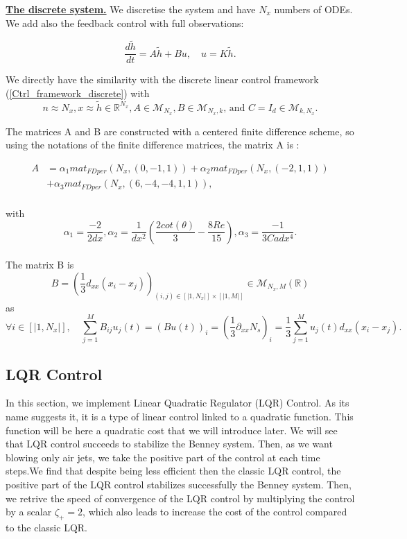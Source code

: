\documentclass[12pt]{article}
\begin{document}
\underline{\textbf{The discrete system.}}
We discretise the system and have $N_x$ numbers of ODEs. We add also the feedback control with full observations: 

\begin{equation}\label{eq_discrete_ctrl_FLF}
\boxed{
\frac{d\tilde{h}}{dt} = A\tilde{h} + B u, \quad u = K\tilde{h}.}
 \end{equation}

We directly have the similarity with the discrete linear control framework (\ref{Ctrl_framework_discrete}) with $$n \approx N_x, x \approx \tilde{h} \in \mathbb{R}^{N_x}, A \in \mathcal{M}_{N_x}, B\in \mathcal{M}_{N_x, k} \text{, and }  C= I_d \in \mathcal{M}_{k, N_x}.$$

The matrices A and B are constructed with a centered finite difference scheme, so using the notations of the finite difference matrices, the matrix A is : 

\begin{equation}
\boxed{
\begin{aligned}
    A &= \alpha_1 mat_{FDper}(N_x, (0, -1, 1))+\alpha_2 mat_{FDper}(N_x, (-2, 1, 1))\\
    &+ \alpha_3 mat_{FDper}(N_x, (6, -4, -4, 1, 1)), \\
\end{aligned}
}
\end{equation}


with $$\alpha_1 = \frac{-2}{2dx}, \alpha_2 = \frac{1}{dx^2}(\frac{2cot(\theta)}{3}-\frac{8Re}{15}), \alpha_3 = \frac{-1}{3Cadx^4}.$$
\\

The matrix B is 
\begin{equation}
    \boxed{
    B = (\frac{1}{3}d_{xx}(x_i-x_j))_{(i, j)\in[|1,N_x|]\times[|1, M|]} \in \mathcal{M}_{N_x, M}(\mathbb{R})
    }
\end{equation}
as $$ \forall i \in [|1, N_x|], \quad \sum_{j=1}^MB_{ij}u_j(t) = (B u(t))_i = (\frac{1}{3}\partial_{xx}N_s)_i = \frac{1}{3}\sum_{j=1}^M u_j(t)d_{xx}(x_i-x_j).$$


\subsection{LQR Control}
In this section, we implement Linear Quadratic Regulator (LQR) Control. As its name suggests it, it is a type of linear control 
linked to a quadratic function. This function will be here a quadratic cost that we will introduce later. We will see that LQR 
control succeeds to stabilize the Benney system. Then, as we want blowing only air jets, we take the positive part of the control
 at each time steps.We find that despite being less efficient then the classic LQR control,  the positive part of the LQR control 
 stabilizes successfully the Benney system. Then, we retrive the speed of convergence of the LQR control by multiplying the control
 by a scalar $\zeta_+ = 2$, which also leads to increase the cost of the control compared to the classic LQR.
\end{document}
